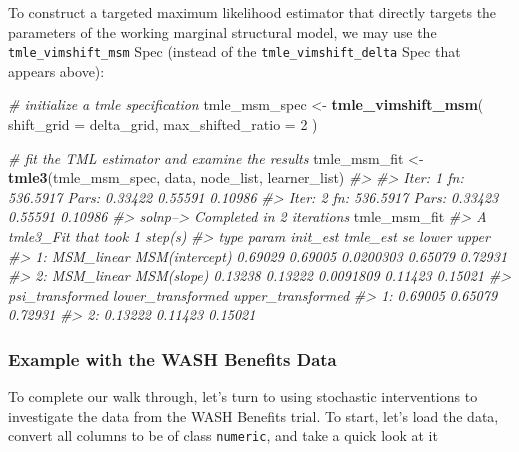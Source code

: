 \documentclass[12pt, krantz2,]{krantz}
\newenvironment{Shaded}{\begin{snugshade}}{\end{snugshade}}
\newcommand{\CommentTok}[1]{\textcolor[rgb]{0.37,0.37,0.37}{\textit{#1}}}
\newcommand{\DataTypeTok}[1]{\textcolor[rgb]{0.27,0.27,0.27}{#1}}
\newcommand{\DecValTok}[1]{\textcolor[rgb]{0.06,0.06,0.06}{#1}}
\newcommand{\KeywordTok}[1]{\textcolor[rgb]{0.27,0.27,0.27}{\textbf{#1}}}
\newcommand{\NormalTok}[1]{#1}
\newcommand{\StringTok}[1]{\textcolor[rgb]{0.5,0.5,0.5}{#1}}
\theoremstyle{definition}
\theoremstyle{definition}
\theoremstyle{definition}
\newcommand{\1}{\mathbbm{1}}
\begin{document}
To construct a targeted maximum likelihood estimator that directly targets the
parameters of the working marginal structural model, we may use the
\texttt{tmle\_vimshift\_msm} Spec (instead of the \texttt{tmle\_vimshift\_delta} Spec that
appears above):

\begin{Shaded}
\begin{Highlighting}[]
\CommentTok{# initialize a tmle specification}
\NormalTok{tmle_msm_spec <-}\StringTok{ }\KeywordTok{tmle_vimshift_msm}\NormalTok{(}
  \DataTypeTok{shift_grid =}\NormalTok{ delta_grid,}
  \DataTypeTok{max_shifted_ratio =} \DecValTok{2}
\NormalTok{)}

\CommentTok{# fit the TML estimator and examine the results}
\NormalTok{tmle_msm_fit <-}\StringTok{ }\KeywordTok{tmle3}\NormalTok{(tmle_msm_spec, data, node_list, learner_list)}
\CommentTok{#> }
\CommentTok{#> Iter: 1 fn: 536.5917  Pars:  0.33422 0.55591 0.10986}
\CommentTok{#> Iter: 2 fn: 536.5917  Pars:  0.33423 0.55591 0.10986}
\CommentTok{#> solnp--> Completed in 2 iterations}
\NormalTok{tmle_msm_fit}
\CommentTok{#> A tmle3_Fit that took 1 step(s)}
\CommentTok{#>          type          param init_est tmle_est        se   lower   upper}
\CommentTok{#> 1: MSM_linear MSM(intercept)  0.69029  0.69005 0.0200303 0.65079 0.72931}
\CommentTok{#> 2: MSM_linear     MSM(slope)  0.13238  0.13222 0.0091809 0.11423 0.15021}
\CommentTok{#>    psi_transformed lower_transformed upper_transformed}
\CommentTok{#> 1:         0.69005           0.65079           0.72931}
\CommentTok{#> 2:         0.13222           0.11423           0.15021}
\end{Highlighting}
\end{Shaded}

\hypertarget{example-with-the-wash-benefits-data}{%
\subsubsection{Example with the WASH Benefits Data}\label{example-with-the-wash-benefits-data}}

To complete our walk through, let's turn to using stochastic interventions to
investigate the data from the WASH Benefits trial. To start, let's load the
data, convert all columns to be of class \texttt{numeric}, and take a quick look at it
\end{document}
